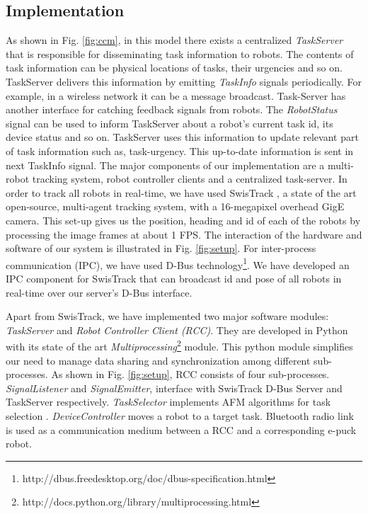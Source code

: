 \documentclass{intech}
\begin{document}
\subsection{Implementation}
As shown in Fig. \ref{fig:ccm}, in this model there exists a centralized \textit{TaskServer} that is responsible for disseminating task information to robots. The contents of task information can be physical locations of tasks, their urgencies and so on. TaskServer delivers this information by emitting \textit{TaskInfo} signals periodically. For example, in a wireless network it can be a message broadcast. Task-Server has another interface for catching feedback signals from robots. The \textit{RobotStatus} signal can be used to inform TaskServer about a robot's current task id, its device status and so on. TaskServer uses this information to update relevant part of task information such as, task-urgency. This up-to-date information is sent in next TaskInfo signal.
The major components of our implementation are a multi-robot tracking system, robot controller clients and a centralized task-server. In order to track all robots in real-time, we have used SwisTrack \cite{Lochmatter+2008}, a state of the art open-source, multi-agent tracking system, with a 16-megapixel overhead GigE camera. This set-up gives us the position, heading and id of each of the robots by processing the image frames at about 1 FPS. The interaction of the hardware and software of our system is illustrated in Fig. \ref{fig:setup}.
For inter-process communication (IPC), we have used D-Bus technology\footnote{http://dbus.freedesktop.org/doc/dbus-specification.html}. We have developed an IPC component for SwisTrack  that can broadcast id and pose of all robots in real-time over our server's D-Bus interface.

Apart from SwisTrack, we have implemented two major software modules: {\em TaskServer} and {\em Robot Controller Client (RCC)}. They are developed in Python with its state of the art \textit{Multiprocessing}\footnote{http://docs.python.org/library/multiprocessing.html} module. This python module simplifies our need to manage data sharing and synchronization among different sub-processes. As shown in Fig. \ref{fig:setup}, RCC consists of four sub-processes. {\em SignalListener} and {\em SignalEmitter}, interface with SwisTrack D-Bus Server and TaskServer respectively. {\em TaskSelector} implements AFM algorithms for task selection . {\em DeviceController} moves a robot to a target task. Bluetooth radio link is used as a communication medium between a RCC and a corresponding e-puck robot. 
\end{document}
